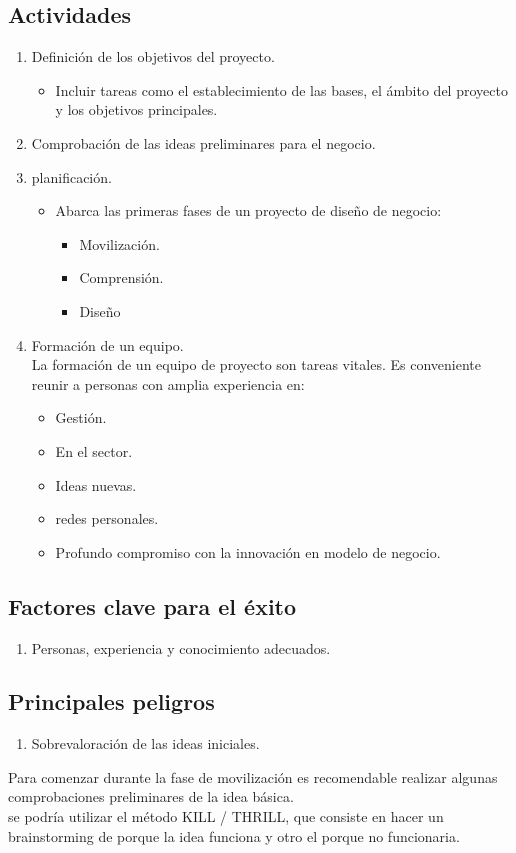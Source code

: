 \documentclass[11pt]{book}
\begin{document}
\subsection{Actividades}
\begin{enumerate}
\item Definición de los objetivos del proyecto.
\begin{itemize}
\item Incluir tareas como el establecimiento de las bases, el ámbito del proyecto y los objetivos principales.
\end{itemize}
\item Comprobación de las ideas preliminares para el negocio.
\item planificación.
\begin{itemize}
\item Abarca las primeras fases de un proyecto de diseño de negocio:
\begin{itemize}
\item Movilización.
\item Comprensión.
\item Diseño
\end{itemize}
\end{itemize}
\item Formación de un equipo.\\
La formación de un equipo de proyecto son tareas vitales. Es conveniente reunir a personas con amplia experiencia en:
\begin{itemize}
\item Gestión.
\item En el sector.
\item Ideas nuevas.
\item redes personales.
\item Profundo compromiso con la innovación en modelo de negocio.
\end{itemize}
\end{enumerate}
\subsection{Factores clave para el éxito}
\begin{enumerate}
\item Personas, experiencia y conocimiento adecuados.
\end{enumerate}
\subsection{Principales peligros}
\begin{enumerate}
\item Sobrevaloración de las ideas iniciales.
\end{enumerate}
Para comenzar durante la fase de movilización es recomendable realizar algunas comprobaciones preliminares de la idea básica. \\
se podría utilizar el método KILL / THRILL, que consiste en hacer un brainstorming de porque la idea funciona y otro el porque no funcionaria.
\end{document}

